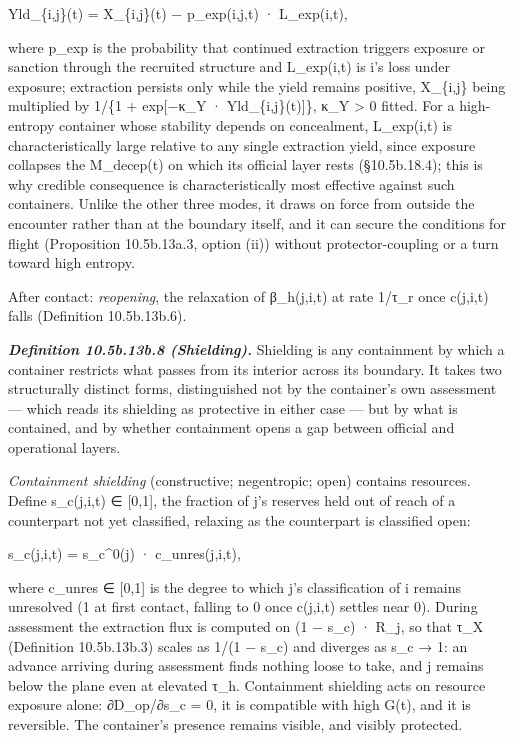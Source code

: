 \documentclass[
]{article}
\begin{document}
Yld\_\{i,j\}(t) = X\_\{i,j\}(t) − p\_exp(i,j,t) · L\_exp(i,t),

where p\_exp is the probability that continued extraction triggers
exposure or sanction through the recruited structure and L\_exp(i,t) is
i's loss under exposure; extraction persists only while the yield
remains positive, X\_\{i,j\} being multiplied by 1/\{1 + exp{[}−κ\_Y ·
Yld\_\{i,j\}(t){]}\}, κ\_Y \textgreater{} 0 fitted. For a high-entropy
container whose stability depends on concealment, L\_exp(i,t) is
characteristically large relative to any single extraction yield, since
exposure collapses the M\_decep(t) on which its official layer rests
(§10.5b.18.4); this is why credible consequence is characteristically
most effective against such containers. Unlike the other three modes, it
draws on force from outside the encounter rather than at the boundary
itself, and it can secure the conditions for flight (Proposition
10.5b.13a.3, option (ii)) without protector-coupling or a turn toward
high entropy.

After contact: \emph{reopening}, the relaxation of β\_h(j,i,t) at rate
1/τ\_r once c(j,i,t) falls (Definition 10.5b.13b.6).

\emph{\textbf{Definition 10.5b.13b.8 (Shielding).}} Shielding is any
containment by which a container restricts what passes from its interior
across its boundary. It takes two structurally distinct forms,
distinguished not by the container's own assessment --- which reads its
shielding as protective in either case --- but by what is contained, and
by whether containment opens a gap between official and operational
layers.

\emph{Containment shielding} (constructive; negentropic; open) contains
resources. Define s\_c(j,i,t) ∈ {[}0,1{]}, the fraction of j's reserves
held out of reach of a counterpart not yet classified, relaxing as the
counterpart is classified open:

s\_c(j,i,t) = s\_c\^{}0(j) · c\_unres(j,i,t),

where c\_unres ∈ {[}0,1{]} is the degree to which j's classification of i
remains unresolved (1 at first contact, falling to 0 once c(j,i,t)
settles near 0). During assessment the extraction flux is computed on
(1 − s\_c) · R\_j, so that τ\_X (Definition 10.5b.13b.3) scales as
1/(1 − s\_c) and diverges as s\_c → 1: an advance arriving during
assessment finds nothing loose to take, and j remains below the plane
even at elevated τ\_h. Containment shielding acts on resource exposure
alone: ∂D\_op/∂s\_c = 0, it is compatible with high G(t), and it is
reversible. The container's presence remains visible, and visibly
protected.
\end{document}
